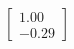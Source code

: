\documentclass[preview]{standalone}
\begin{document}
\begin{align*}
\begin{bmatrix} 1.00 \\ -0.29 \end{bmatrix}
\end{align*}
\end{document}
